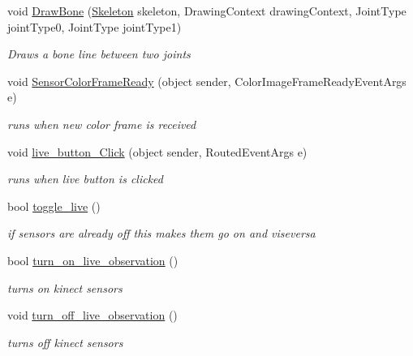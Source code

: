 \begin{DoxyCompactItemize}
void \hyperlink{classUTKinectSkeletonMovementDetector_1_1MainWindow_a8bc4e46bf5d40db49eb2bacb339604b8}{Draw\-Bone} (\hyperlink{classUTKinectSkeletonMovementDetector_1_1MainWindow_aeaae83e3e199c75e2975b19e7f9e881e}{Skeleton} skeleton, Drawing\-Context drawing\-Context, Joint\-Type joint\-Type0, Joint\-Type joint\-Type1)
\begin{DoxyCompactList}\small\item\em Draws a bone line between two joints \end{DoxyCompactList}\item 
void \hyperlink{classUTKinectSkeletonMovementDetector_1_1MainWindow_a6f616ab01ec4ad3f0c0a3b31d1d47fe8}{Sensor\-Color\-Frame\-Ready} (object sender, Color\-Image\-Frame\-Ready\-Event\-Args e)
\begin{DoxyCompactList}\small\item\em runs when new color frame is received \end{DoxyCompactList}\item 
void \hyperlink{classUTKinectSkeletonMovementDetector_1_1MainWindow_a6ec33e1f54a6e9ebf73872f913b259b6}{live\-\_\-button\-\_\-\-Click} (object sender, Routed\-Event\-Args e)
\begin{DoxyCompactList}\small\item\em runs when live button is clicked \end{DoxyCompactList}\item 
bool \hyperlink{classUTKinectSkeletonMovementDetector_1_1MainWindow_aa6851d45043318d1c46f38a46de4ac52}{toggle\-\_\-live} ()
\begin{DoxyCompactList}\small\item\em if sensors are already off this makes them go on and viseversa \end{DoxyCompactList}\item 
bool \hyperlink{classUTKinectSkeletonMovementDetector_1_1MainWindow_a1f752843e3733066b6fadeb7afa9614d}{turn\-\_\-on\-\_\-live\-\_\-observation} ()
\begin{DoxyCompactList}\small\item\em turns on kinect sensors \end{DoxyCompactList}\item 
void \hyperlink{classUTKinectSkeletonMovementDetector_1_1MainWindow_ababdd6965867a2b7eb106d56612b47ef}{turn\-\_\-off\-\_\-live\-\_\-observation} ()
\begin{DoxyCompactList}\small\item\em turns off kinect sensors \end{DoxyCompactList}\item 

\end{DoxyCompactItemize}
